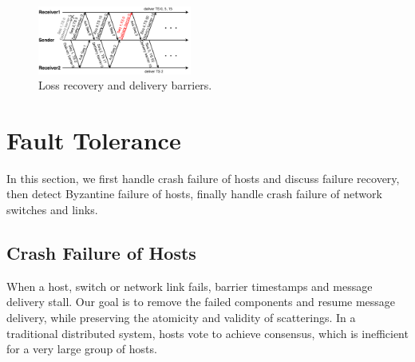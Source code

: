 {\begin{figure}[t]
\centering
\includegraphics[width=0.45\textwidth]{images/loss_detection.pdf}
\caption{Loss recovery and delivery barriers.}
\label{fig:ack-barrier}
\vspace{-0.4em}
\end{figure}




\section{Fault Tolerance}
\label{sec:failure}

In this section, we first handle crash failure of hosts and discuss failure recovery, then detect Byzantine failure of hosts, finally handle crash failure of network switches and links.


\subsection{Crash Failure of Hosts}
\label{sec:host-failure}

When a host, switch or network link fails, barrier timestamps and message delivery stall.
Our goal is to remove the failed components and resume message delivery, while preserving the atomicity and validity of scatterings.
In a traditional distributed system, hosts vote to achieve consensus, which is inefficient for a very large group of hosts.

}
